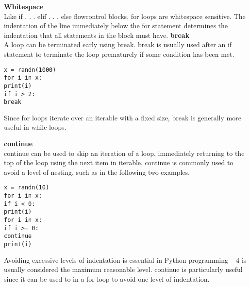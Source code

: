 \documentclass[KSmain.tex]{subfiles}
\begin{document}
\textbf{Whitespace}\\
Like if . . . elif . . . else flowcontrol blocks, for loops are whitespace sensitive. The indentation of the line
immediately below the for statement determines the indentation that all statements in the block must
have.
\textbf{break}\\
A loop can be terminated early using break. break is usually used after an if statement to terminate the
loop prematurely if some condition has been met.
\begin{framed}
\begin{verbatim}
x = randn(1000)
for i in x:
print(i)
if i > 2:
break
\end{verbatim}
\end{framed}
Since for loops iterate over an iterable with a fixed size, break is generally more useful in while loops.

\textbf{continue}\\
continue can be used to skip an iteration of a loop, immediately returning to the top of the loop using the
next item in iterable. continue is commonly used to avoid a level of nesting, such as in the following two
examples.
\begin{framed}
\begin{verbatim}
x = randn(10)
for i in x:
if i < 0:
print(i)
for i in x:
if i >= 0:
continue
print(i)
\end{verbatim}
\end{framed}
Avoiding excessive levels of indentation is essential in Python programming – 4 is usually considered the
maximum reasonable level. continue is particularly useful since it can be used to in a for loop to avoid
one level of indentation.
\newpage
\end{document}
